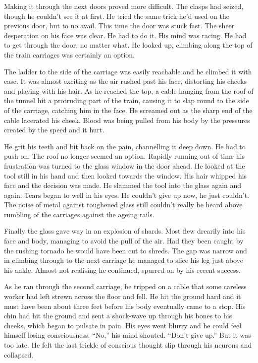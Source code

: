 Making it through the next doors proved more difficult.  The clasps had seized, though he couldn't see it at first.  He tried the same trick he'd used on the previous door, but to no avail.  This time the door was stuck fast.  The sheer desperation on his face was clear.  He had to do it.  His mind was racing.  He had to get through the door, no matter what.  He looked up, climbing along the top of the train carriages was certainly an option.

The ladder to the side of the carriage was easily reachable and he climbed it with ease.  It was almost exciting as the air rushed past his face, distorting his cheeks and playing with his hair.  As he reached the top, a cable hanging from the roof of the tunnel hit a protruding part of the train, causing it to slap round to the side of the carriage, catching him in the face.  He screamed out as the sharp end of the cable lacerated his cheek.  Blood was being pulled from his body by the pressures created by the speed and it hurt.  

He grit his teeth and bit back on the pain, channelling it deep down.  He had to push on.  The roof no longer seemed an option.  Rapidly running out of time his frustration was turned to the glass window in the door ahead.  He looked at the tool still in his hand and then looked towards the window.  His hair whipped his face and the decision was made.  He slammed the tool into the glass again and again.  Tears began to well in his eyes.  He couldn't give up now, he just couldn't.  The noise of metal against toughened glass still couldn't really be heard above rumbling of the carriages against the ageing rails.

Finally the glass gave way in an explosion of shards.  Most flew drearily into his face and body, managing to avoid the pull of the air.  Had they been caught by the rushing tornado he would have been cut to shreds.  The gap was narrow and in climbing through to the next carriage he managed to slice his leg just above his ankle.  Almost not realising he continued, spurred on by his recent success.

As he ran through the second carriage, he tripped on a cable that some careless worker had left strewn across the floor and fell.  He hit the ground hard and it must have been about three feet before his body eventually came to a stop.  His chin had hit the ground and sent a shock-wave up through his bones to his cheeks, which began to pulsate in pain.  His eyes went blurry and he could feel himself losing consciousness.  ``No,'' his mind shouted.  ``Don't give up.''  But it was too late.  He felt the last trickle of conscious thought slip through his neurons and collapsed.



